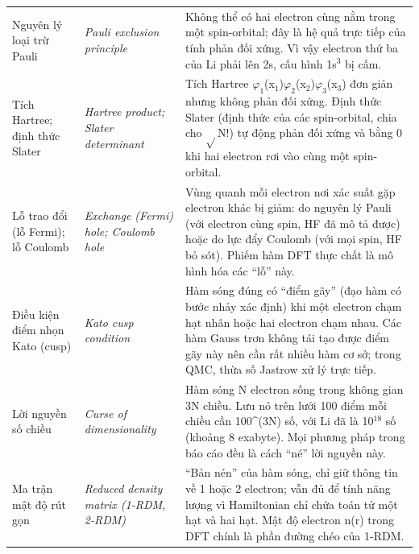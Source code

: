 \begin{longtable}{@{}>{\raggedright\arraybackslash}p{}>{\raggedright\arraybackslash\itshape}p{}>{\raggedright\arraybackslash}p{}@{}}
Nguyên lý loại trừ Pauli & Pauli exclusion principle & Không thể có hai electron cùng nằm trong một spin-orbital; đây là hệ quả trực tiếp của tính phản đối xứng. Vì vậy electron thứ ba của Li phải lên 2s, cấu hình 1s$^{3}$ bị cấm. \\[2pt]
Tích Hartree; định thức Slater & Hartree product; Slater determinant & Tích Hartree $\varphi_{1}$(x$_{1}$)$\varphi_{2}$(x$_{2}$)$\varphi_{3}$(x$_{3}$) đơn giản nhưng không phản đối xứng. Định thức Slater (định thức của các spin-orbital, chia cho $\sqrt{}$N!) tự động phản đối xứng và bằng 0 khi hai electron rơi vào cùng một spin-orbital. \\[2pt]
Lỗ trao đổi (lỗ Fermi); lỗ Coulomb & Exchange (Fermi) hole; Coulomb hole & Vùng quanh mỗi electron nơi xác suất gặp electron khác bị giảm: do nguyên lý Pauli (với electron cùng spin, HF đã mô tả được) hoặc do lực đẩy Coulomb (với mọi spin, HF bỏ sót). Phiếm hàm DFT thực chất là mô hình hóa các ``lỗ'' này. \\[2pt]
Điều kiện điểm nhọn Kato (cusp) & Kato cusp condition & Hàm sóng đúng có ``điểm gãy'' (đạo hàm có bước nhảy xác định) khi một electron chạm hạt nhân hoặc hai electron chạm nhau. Các hàm Gauss trơn không tái tạo được điểm gãy này nên cần rất nhiều hàm cơ sở; trong QMC, thừa số Jastrow xử lý trực tiếp. \\[2pt]
Lời nguyền số chiều & Curse of dimensionality & Hàm sóng N electron sống trong không gian 3N chiều. Lưu nó trên lưới 100 điểm mỗi chiều cần 100\textasciicircum{}(3N) số, với Li đã là 10$^{18}$ số (khoảng 8 exabyte). Mọi phương pháp trong báo cáo đều là cách ``né'' lời nguyền này. \\[2pt]
Ma trận mật độ rút gọn & Reduced density matrix (1-RDM, 2-RDM) & ``Bản nén'' của hàm sóng, chỉ giữ thông tin về 1 hoặc 2 electron; vẫn đủ để tính năng lượng vì Hamiltonian chỉ chứa toán tử một hạt và hai hạt. Mật độ electron n(r) trong DFT chính là phần đường chéo của 1-RDM. \\[2pt]
\bottomrule\end{longtable}
